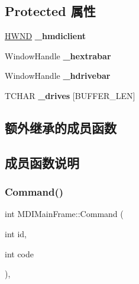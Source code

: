 \subsection*{Protected 属性}
\begin{DoxyCompactItemize}
\item 
\mbox{\label{struct_m_d_i_main_frame_af50e8bd1b2c5fb9f4d9c85ea1a69a0ca}} 
\hyperlink{interfacevoid}{H\+W\+ND} {\bfseries \+\_\+hmdiclient}
\item 
\mbox{\label{struct_m_d_i_main_frame_a18329b3ace4bfb3f5504a94bb5493c51}} 
Window\+Handle {\bfseries \+\_\+hextrabar}
\item 
\mbox{\label{struct_m_d_i_main_frame_a6aa6b7d24502f91a83398098382d325d}} 
Window\+Handle {\bfseries \+\_\+hdrivebar}
\item 
\mbox{\label{struct_m_d_i_main_frame_a83d4a8b801c7593b16cab17d0f759214}} 
T\+C\+H\+AR {\bfseries \+\_\+drives} \mbox{[}B\+U\+F\+F\+E\+R\+\_\+\+L\+EN\mbox{]}
\end{DoxyCompactItemize}
\subsection*{额外继承的成员函数}


\subsection{成员函数说明}
\mbox{\label{struct_m_d_i_main_frame_a96be11d77604f4dc731c486a7926f8a1}} 
\subsubsection{\texorpdfstring{Command()}{Command()}}
{\footnotesize\ttfamily int M\+D\+I\+Main\+Frame\+::\+Command (\begin{DoxyParamCaption}\item[{int}]{id,  }\item[{int}]{code }\end{DoxyParamCaption})\hspace{0.3cm}{\ttfamily [protected]}, {\ttfamily [virtual]}}

